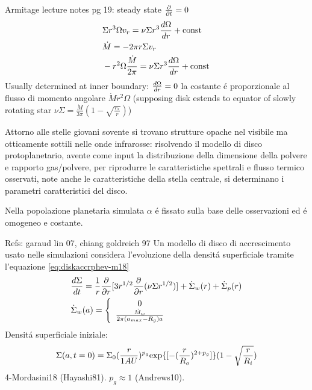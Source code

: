 \begin{workout}
	Armitage lecture notes pg 19: steady state $\frac{\partial}{\partial t}=0$
	\begin{align*}
	&\Sigma r^3\Omega v_r=\nu\Sigma r^3\frac{d \Omega}{d r}+\operatorname{const}{}\\
	&\dot{M}=-2\pi r\Sigma v_r\\
	&-r^2\Omega\frac{\dot{M}}{2\pi}=\nu\Sigma r^3\frac{d \Omega}{d r}+\operatorname{const}{}
	\end{align*}
	Usually determined at inner boundary: $\frac{d \Omega}{d r}=0$ la costante \'e proporzionale al flusso di momento angolare $\dot{M}r^2\Omega$ (supposing disk estends to equator of slowly rotating star $\nu\Sigma=\frac{\dot{M}}{3\pi}(1-\sqrt{\frac{r_*}{r}})$)
\end{workout}

\begin{errata}
	Attorno alle stelle giovani sovente si trovano strutture opache nel visibile ma otticamente sottili nelle onde infrarosse: risolvendo il modello di disco protoplanetario, avente come input la distribuzione della dimensione della polvere e rapporto gas/polvere, per riprodurre le caratteristiche spettrali e flusso termico osservati, note anche le caratteristiche della stella centrale, si determinano i parametri caratteristici del disco.
\end{errata}

\begin{workout}
	Nella popolazione planetaria simulata $\alpha$ \'e fissato sulla base delle osservazioni  ed \'e omogeneo e costante.
\end{workout}

\begin{workout}
	Refs: garaud lin 07, chiang goldreich 97
	Un modello di disco  di accrescimento usato nelle simulazioni considera l'evoluzione della densit\'a superficiale tramite l'equazione \eqref{eq:diskaccrphev-m18}
	\begin{align}
	&\frac{d \Sigma}{d t}=\frac{1}{r}\frac{\partial}{\partial r}[3r^{1/2}\frac{\partial}{\partial r}(\nu\Sigma r^{1/2})]+\dot{\Sigma}_w(r)+\dot{\Sigma}_p(r)\label{eq:diskaccrphev-m18}\\
	&\dot{\Sigma}_w(a)=\left\{\begin{array}{c}0\\\frac{\dot{M}_w}{2\pi(a_{max}-R_g)a}\\\end{array}\right.
	\end{align}
	Densit\'a superficiale iniziale:
	\begin{equation}
	\Sigma(a,t=0)=\Sigma_0(\frac{r}{1AU})^{p_g}\text{exp}\{[-(\frac{r}{R_o})^{2+p_g}]\}(1-\sqrt{\frac{r}{R_i}})
	\end{equation}
	4-Mordasini18 (Hayashi81). $p_g\approx1$ (Andrews10).
\end{workout}

